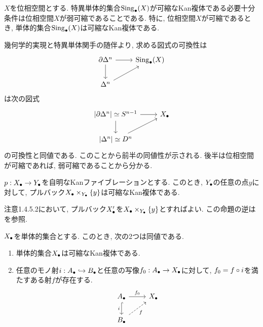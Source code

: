 \documentclass[uplatex, a4paper, 14Q, dvipdfmx]{jsreport}
\begin{document}
\begin{example}
  $X$を位相空間とする. 
  特異単体的集合$\mathrm{Sing}_\bullet(X)$が可縮なKan複体である必要十分条件は位相空間$X$が弱可縮であることである. 
  特に, 位相空間$X$が可縮であるとき, 単体的集合$\mathrm{Sing}_\bullet(X)$は可縮なKan複体である. 
\end{example}

\begin{Proof}
  幾何学的実現と特異単体関手の随伴より, 求める図式の可換性は
  \[\begin{tikzcd}
    {\del \Delta^n} & {\Sing_\bullet(X)} \\
    {\Delta^n}
    \arrow[from=1-1, to=1-2]
    \arrow[from=2-1, to=1-2]
    \arrow[from=1-1, to=2-1]
  \end{tikzcd}\]
  は次の図式
  \[\begin{tikzcd}
    {|\del \Delta^n|\simeq S^{n-1}} & \X \\
    {|\Delta^n|\simeq D^n}
    \arrow[from=1-1, to=1-2]
    \arrow[from=2-1, to=1-2]
    \arrow[from=1-1, to=2-1]
  \end{tikzcd}\]
  の可換性と同値である. このことから前半の同値性が示される. 
  後半は位相空間が可縮であれば, 弱可縮であることから分かる. 
\end{Proof}

\begin{remark}
  $p: X_\bullet \to Y_\bullet$を自明なKanファイブレーションとする.
  このとき, $Y_\bullet$の任意の点$y$に対して, プルバック$X_\bullet \times_{Y_\bullet} \{y\}$は可縮なKan複体である. 
\end{remark}

\begin{Proof}
  注意1.4.5.2において, プルバック$X_\bullet'$を$X_\bullet \times_{Y_\bullet} \{y\}$とすればよい. 
  この命題の逆は\cite[\href{https://kerodon.net/tag/00X2}{Tag 00X2}]{kerodon}を参照.
\end{Proof}

\begin{cor}
  $X_\bullet$を単体的集合とする. 
  このとき, 次の2つは同値である. 
  \begin{enumerate}
    \item 単体的集合$X_\bullet$は可縮なKan複体である.
    \item 任意のモノ射$i: A_\bullet \hookrightarrow B_\bullet$と任意の写像$f_0: A_\bullet \to X_\bullet$に対して, $f_0=f \circ i$を満たすある射$f$が存在する. 
    \[\begin{tikzcd}
      \A & \X \\
      \B
      \arrow["{f_0}", from=1-1, to=1-2]
      \arrow["f"', dashed, from=2-1, to=1-2]
      \arrow["i"', hook, from=1-1, to=2-1]
    \end{tikzcd}\]
  \end{enumerate}
\end{cor}
\end{document}
